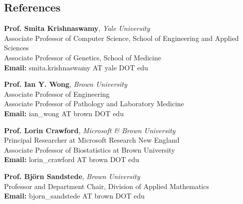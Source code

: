 \documentclass[margin,line]{res}
\newenvironment{list3}{
  \begin{list}{\textopenbullet}{
      \setlength{\itemsep}{0in}
      \setlength{\parsep}{0in} \setlength{\parskip}{0in}
      \setlength{\topsep}{0in} \setlength{\partopsep}{0in}
      \setlength{\leftmargin}{0.1in}}}{\end{list}}
\begin{document}
\begin{resume}

{
\vspace*{.3cm}

\section{\sc References}

{\bf Prof. Smita Krishnaswamy}, \textit{Yale University}\\[.1cm]
Associate Professor of Computer Science, School of Engineering and Applied Sciences\\[.1cm]
Associate Professor of Genetics, School of Medicine\\[.1cm]
{\bf Email:} smita.krishnaswamy AT yale DOT edu

\vspace*{.1cm}

{\bf Prof. Ian Y. Wong}, \textit{Brown University}\\[.1cm]
Associate Professor of Engineering\\[.1cm]
Associate Professor of Pathology and Laboratory Medicine\\[.1cm]
{\bf Email:} ian\_wong AT brown DOT edu

\vspace*{.1cm}

{\bf Prof. Lorin Crawford}, \textit{Microsoft \& Brown University}\\[.1cm]
Principal Researcher at Microsoft Research New England\\[.1cm]
Associate Professor of Biostatistics at Brown University\\[.1cm]
{\bf Email:} lorin\_crawford AT brown DOT edu

\vspace*{.1cm}

{\bf Prof. Bj\"{o}rn Sandstede}, \textit{Brown University}\\[.1cm]
Professor and Department Chair, Division of Applied Mathematics\\[.1cm]
{\bf Email:} bjorn\_sandstede AT brown DOT edu
}

\end{resume}
\end{document}
